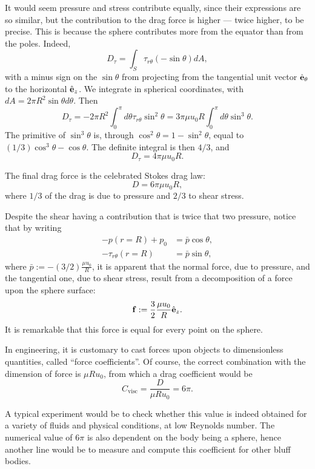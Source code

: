 It would seem pressure and stress contribute equally, since their
expressions are so similar, but the contribution to the drag force is
higher --- twice higher, to be precise. This is because the sphere
contributes more from the equator than from the poles. Indeed,
\[
  D_\tau =  \int_S  \tau_{r\theta} (- \sin\theta) dA ,
\]
with a minus sign on the $\sin\theta$ from projecting from the
tangential unit vector $\hat{\mathbf{e}}_\theta$ to the horizontal $\hat{\mathbf{e}}_z$.  We
integrate in spherical coordinates, with
$dA=2\pi R^2 \sin\theta d\theta$. Then
\[
  D_\tau =
  - 2\pi R^2 \int_0^\pi d\theta   \tau_{r\theta} \sin^2\theta  =
  3 \pi \mu u_0 R  \int_0^\pi d\theta \sin^3\theta .
\]
The primitive of $\sin^3\theta$ is, through
$\cos^2\theta=1-\sin^2\theta$, equal to
$(1/3) \cos^3\theta - \cos\theta$. The definite integral is then $4/3$, and
\[
  D_\tau = 4 \pi \mu u_0 R .
\]

The final drag force is the celebrated Stokes drag law: 
\[
  D = 6 \pi \mu u_0 R ,
\]
where $1/3$ of the drag is due to pressure and $2/3$ to shear stress.

Despite the shear having a contribution that is twice that two
pressure, notice that by writing 
\begin{align*}
  - p(r=R) + p_0 &= \bar{p} \cos\theta,  \\
  -\tau_{r\theta} (r=R) &= \bar{p} \sin\theta,  
\end{align*}
where $\bar{p} := - (3/2) \frac{\mu u_0}{R}$, it is apparent that the
normal force, due to pressure, and the tangential one, due to shear
stress, result from a decomposition of a force upon the sphere surface:
\[
  \mathbf{f} := \frac32 \frac{\mu u_0}{R} \hat{\mathbf{e}}_z .
\]
It is remarkable that this force is equal for every point on the
sphere.

In engineering, it is customary to cast forces upon objects to
dimensionless quantities, called ``force coefficients''.  Of course, the correct combination with the dimension
of force is $\mu R u_0$, from which a drag coefficient would be
\[
  C_\mathrm{visc} = \frac{ D }{ \mu R u_0 } = 6\pi .
\]

A typical experiment would be to check whether this value is indeed
obtained for a variety of fluids and physical conditions, at low
Reynolds number. The numerical value of $6\pi$ is also dependent
on the body being a sphere, hence another line would be to measure
and compute this coefficient for other bluff bodies.

